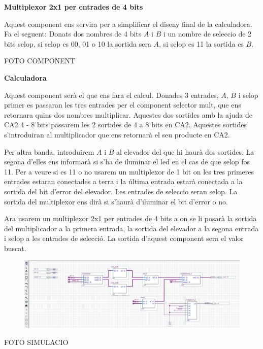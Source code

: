 \documentclass[12pt, a4papre]{article}
\begin{document}
	\textbf{\large{Multiplexor 2x1 per entrades de 4 bits}}
	
	Aquest component ens servira per a simplificar el diseny final de la calculadora. Fa el seguent: Donats dos nombres de 4 bits $A$ i $B$ i un nombre de seleccio de 2 bits selop, si selop es 00, 01 o 10 la sortida sera $A$, si selop es 11 la sortida es $B$.
	
	\begin{center}
		FOTO COMPONENT
	\end{center}
	
	\textbf{\large{Calculadora}}
	
	Aquest component serà el que ens fara el calcul. Donades 3 entrades, $A$, $B$ i selop primer es passaran les tres entrades per el component selector mult, que ens retornara quins dos nombres multiplicar. Aquestes dos sortides amb la ajuda de CA2 4 - 8 bits passarem les 2 sortides de 4 a 8 bits en CA2. Aquestes sortides s'introduiran al multiplicador que ens retornarà el seu producte en CA2. 
	
	Per altra banda, introduirem $A$ i $B$ al elevador del que hi haurà dos sortides. La segona d'elles ens informarà si s'ha de iluminar el led en el cas de que selop fos 11. Per a veure si es 11 o no usarem un multiplexor de 1 bit on les tres primeres entrades estaran conectades a terra i la última entrada estarà conectada a la sortida del bit d'error del elevador. Les entrades de seleccio seran selop. La sortida del multiplexor ens dirà si s'haurà d'iluminar el bit d'error o no.
	
	Ara usarem un multiplexor 2x1 per entrades de 4 bits a on se li posarà la sortida del multiplicador a la primera entrada, la sortida del elevador a la segona entrada i selop a les entrades de selecció. La sortida d'aquest component sera el valor buscat.
	
	\begin{center}
	\begin{figure}[H]
		\begin{center}
		\includegraphics[width=150mm]{calculadora.jpeg}
		\end{center}
	\end{figure}
	\end{center}
	\begin{center}
		
		
		FOTO SIMULACIO
	\end{center}
	
\end{document}
